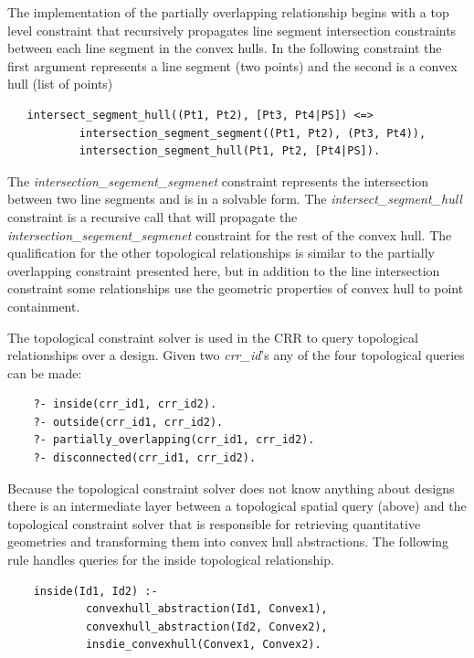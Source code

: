 \documentclass[12pt]{ucthesis}
\begin{document}
The implementation of the partially overlapping relationship begins with a top level constraint that recursively propagates line segment intersection constraints between each line segment in the convex hulls. In the following constraint the first argument represents a line segment (two points) and the second is a convex hull (list of points)
\begin{verbatim}
   intersect_segment_hull((Pt1, Pt2), [Pt3, Pt4|PS]) <=>
           intersection_segment_segment((Pt1, Pt2), (Pt3, Pt4)),
           intersection_segment_hull(Pt1, Pt2, [Pt4|PS]).
\end{verbatim} The \emph{intersection\_segement\_segmenet} constraint represents the intersection between two line segments and is in a solvable form. The \emph{intersect\_segment\_hull} constraint is a recursive call that will propagate the \emph{intersection\_segement\_segmenet} constraint for the rest of the convex hull. The qualification for the other topological relationships is similar to the partially overlapping constraint presented here, but in addition to the line intersection constraint some relationships use the geometric properties of convex hull to point containment.



The topological constraint solver is used in the CRR to query topological relationships over a design. Given two \emph{crr\_id}'s any of the four topological queries can be made: 
\begin{verbatim}
    ?- inside(crr_id1, crr_id2).
    ?- outside(crr_id1, crr_id2).
    ?- partially_overlapping(crr_id1, crr_id2).
    ?- disconnected(crr_id1, crr_id2).
\end{verbatim}Because the topological constraint solver
does not know anything about designs there is an intermediate layer between a topological spatial query (above) and the topological constraint solver that is responsible for retrieving quantitative geometries and transforming them into convex hull abstractions. The following rule handles queries for the inside topological relationship.
\begin{verbatim}
    inside(Id1, Id2) :-
            convexhull_abstraction(Id1, Convex1),
            convexhull_abstraction(Id2, Convex2),
            insdie_convexhull(Convex1, Convex2).
\end{verbatim}
\end{document}
